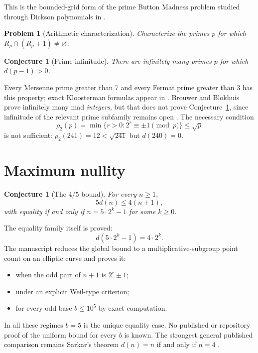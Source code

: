 \documentclass[a4paper]{article}
\newtheorem{conjecture}[theorem]{Conjecture}
\newtheorem{problem}[theorem]{Problem}
\begin{document}
This is the bounded-grid form of the prime Button Madness problem studied
through Dickson polynomials in \cite{BlokhuisEtAl2018}.

\begin{problem}[Arithmetic characterization]\label{prob:prime-mad}
	Characterize the primes $p$ for which
	$R_p\cap(R_p+1)\neq\varnothing$.
\end{problem}

\begin{conjecture}[Prime infinitude]\label{conj:prime-mad}
	There are infinitely many primes $p$ for which $d(p-1)>0$.
\end{conjecture}

Every Mersenne prime greater than $7$ and every Fermat prime greater than
$3$ has this property; exact Kloosterman formulas appear in
.  Brouwer and Blokhuis
prove infinitely many mad \emph{integers}, but that does not prove
Conjecture~\ref{conj:prime-mad}, since infinitude of the relevant prime
subfamily remains open \cite{BrouwerMadness}.  The necessary condition
\[
	\rho_2(p)=\min\{r>0:2^r\equiv\pm1\pmod p\}\leq\sqrt p
\]
is not sufficient: $\rho_2(241)=12<\sqrt{241}$ but $d(240)=0$.

\section{Maximum nullity}

\begin{conjecture}[The $4/5$ bound]\label{conj:four-fifths}
	For every $n\geq1$,
	\[
		5d(n)\leq4(n+1),
	\]
	with equality if and only if
	$n=5\cdot2^k-1$ for some $k\geq0$.
\end{conjecture}

The equality family itself is proved:
\[
	d(5\cdot2^k-1)=4\cdot2^k.
\]
The manuscript  reduces the global
bound to a multiplicative-subgroup point count on an elliptic curve and
proves it:
\begin{itemize}
	\item when the odd part of $n+1$ is $2^r\pm1$;
	\item under an explicit Weil-type criterion;
	\item for every odd base $b\leq10^5$ by exact computation.
\end{itemize}
In all these regimes $b=5$ is the unique equality case.  No published or
repository proof of the uniform bound for every $b$ is known.
The strongest general published comparison remains Sarkar's theorem
$d(n)=n$ if and only if $n=4$ \cite{Sarkar1996}.
\end{document}
